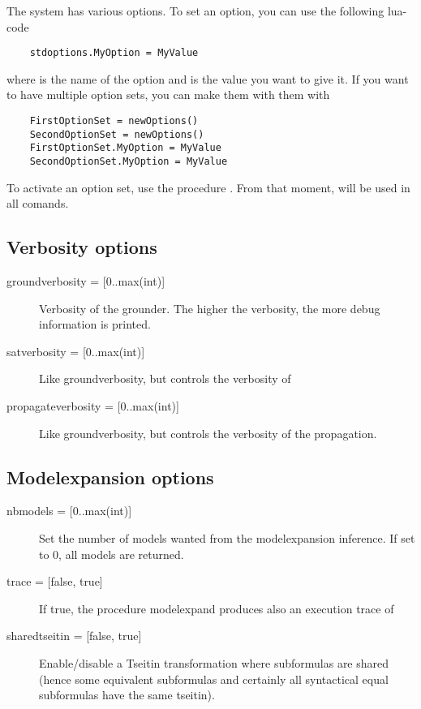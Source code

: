 The \idp system has various options.  To set an option, you can use the following lua-code
\begin{lstlisting}
	stdoptions.MyOption = MyValue
\end{lstlisting}
where  is the name of the option and  is the value you want to give it. If you want to have multiple option sets, you can make them with them with
\begin{lstlisting}
	FirstOptionSet = newOptions()
	SecondOptionSet = newOptions()
	FirstOptionSet.MyOption = MyValue
	SecondOptionSet.MyOption = MyValue
\end{lstlisting}
To activate an option set, use the procedure .  From that moment,  will be used in all comands.

\subsection{Verbosity options}
\begin{description}
	\item[{groundverbosity = [0..max(int)]}] Verbosity of the grounder.  The higher the verbosity, the more debug information is printed.
	\item[{satverbosity = [0..max(int)]}] Like groundverbosity, but controls the verbosity of \minisatid
	\item[{propagateverbosity = [0..max(int)]}] Like groundverbosity, but controls the verbosity of the propagation.
\end{description}

\subsection{Modelexpansion options}
\begin{description}
	\item[{nbmodels = [0..max(int)]}] Set the number of models wanted from the modelexpansion inference.  If set to 0, all models are returned.
	\item[{trace = [false, true]}] If true, the procedure modelexpand produces also an execution trace of \minisatid 
	\item[{sharedtseitin = [false, true]}] Enable/disable a Tseitin transformation where subformulas are shared (hence some equivalent subformulas and certainly all syntactical equal subformulas have the same tseitin).
\end{description}

